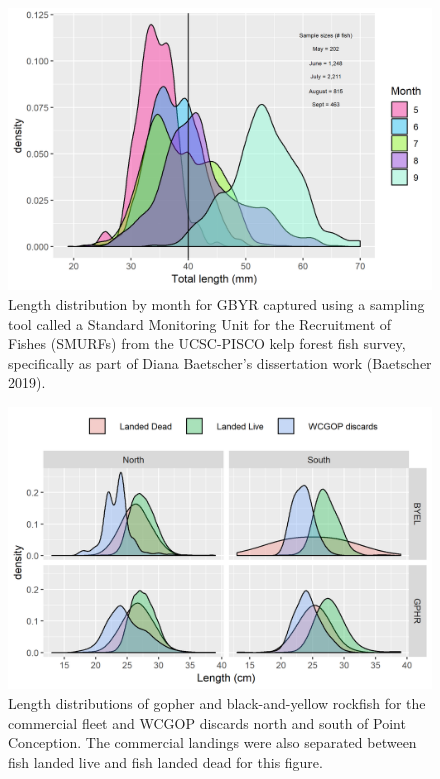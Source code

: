 \documentclass[12pt,]{article}
\begin{document}
\begin{figure}
\centering
\includegraphics{Figures/SMURF_lengths.png}
\caption{Length distribution by month for GBYR captured using a sampling
tool called a Standard Monitoring Unit for the Recruitment of Fishes
(SMURFs) from the UCSC-PISCO kelp forest fish survey, specifically as
part of Diana Baetscher's dissertation work (Baetscher 2019).
\label{fig:SMURF_lengths}}
\end{figure}

\FloatBarrier

\begin{figure}
\centering
\includegraphics{Figures/Comm_lengths_justification.png}
\caption{Length distributions of gopher and black-and-yellow rockfish
for the commercial fleet and WCGOP discards north and south of Point
Conception. The commercial landings were also separated between fish
landed live and fish landed dead for this figure.
\label{fig:Comm_lengths_justification}}
\end{figure}
\end{document}
